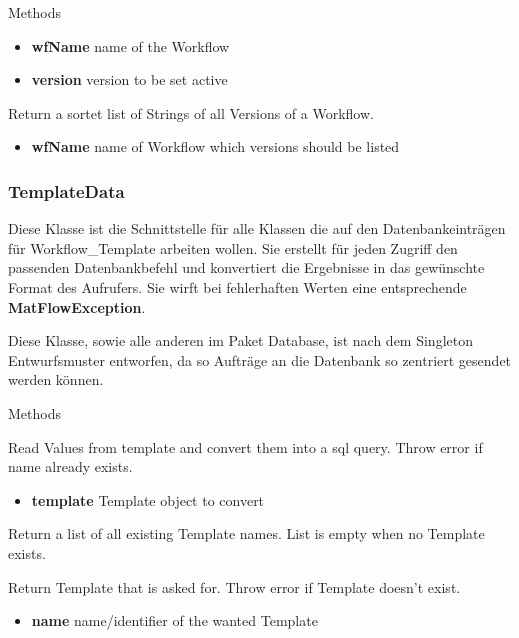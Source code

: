 \begin{methodenv}{Methods}
\begin{itemize}
	\item \textbf{wfName}
	name of the Workflow
	\item \textbf{version}
	version to be set active
\end{itemize}

Return a sortet list of Strings of all Versions of a Workflow.

\begin{itemize}
	\item \textbf{wfName}
	name of Workflow which versions should be listed
\end{itemize}

\end{methodenv}


\subsubsection{TemplateData}
Diese Klasse ist die Schnittstelle für alle Klassen die auf den Datenbankeinträgen für Workflow\_Template arbeiten wollen. Sie erstellt für jeden Zugriff den passenden Datenbankbefehl und konvertiert die Ergebnisse in das gewünschte Format des Aufrufers.
Sie wirft bei fehlerhaften Werten eine entsprechende \textbf{MatFlowException}.

Diese Klasse, sowie alle anderen im Paket Database, ist nach dem Singleton Entwurfsmuster entworfen, da so Aufträge an die Datenbank so zentriert gesendet werden können.

\begin{methodenv}{Methods}
	
Read Values from template and convert them into a sql query.
Throw error if name already exists.

\begin{itemize}
	\item \textbf{template}
	Template object to convert
\end{itemize}

Return a list of all existing Template names.
List is empty when no Template exists.

Return Template that is asked for.
Throw error if Template doesn't exist.

\begin{itemize}
	\item \textbf{name}
	name/identifier of the wanted Template
\end{itemize}

\end{methodenv}

